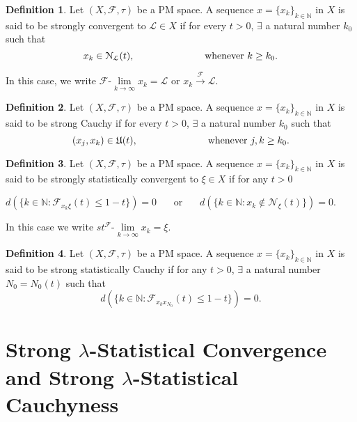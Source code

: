 \documentclass[reqno,b5paper]{amsart}
\theoremstyle{plain}
\theoremstyle{definition}
\newtheorem{defn}{Definition}[section]
\begin{document}
\begin{defn}\cite{Se}
Let $(X,\mathcal{F},\tau)$ be a PM space. A sequence
$x=\{x_k\}_{k\in \mathbb{N}}$ in $X$ is said to be strongly
convergent to $\mathcal{L}\in X$ if for every $t>0$, $\exists$ a
natural number $k_0$ such that
$$x_k\in\mathcal{N}_\mathcal{L}(t),\hspace{1 in} \text{whenever}~ k\geq k_0.$$
\end{defn}
In this case, we write
$\mathcal{F}$-$\lim\limits_{k\rightarrow\infty}x_k=\mathcal{L}$ or
$x_k\stackrel{\mathcal{F}}\longrightarrow \mathcal{L}$.
\begin{defn}\cite{Sh4}
Let $(X,\mathcal{F},\tau)$ be a PM space. A sequence
$x=\{x_k\}_{k\in \mathbb{N}}$ in $X$ is said to be strong Cauchy
if for every $t>0$, $\exists$ a natural number $k_0$ such that
$$(x_j,x_k)\in\mathfrak{U}(t), \hspace{1 in} \text{whenever}~ j,k\geq k_0 .$$
\end{defn}
\begin{defn}\cite{Se}
Let $(X,\mathcal{F},\tau)$ be a PM space. A sequence $x=\{x_k\}_{k
\in \mathbb{N}}$ in $X$ is said to be strongly statistically
convergent to $\xi\in X$ if for any $t>0$
\begin{center}
$d(\{ k\in\mathbb{N}: \mathcal{F}_{x_k\xi}(t)\leq1-t\})=0
~~~~~~~~\text{or}~~~~~~~~ d(\{ k\in\mathbb{N}:
x_k\notin\mathcal{N}_\xi(t)\})=0.$
\end{center}
In this case we write
$st^{\mathcal{F}}$-$\lim\limits_{k\rightarrow \infty}x_k =\xi$.
\end{defn}
\begin{defn}
Let $(X,\mathcal{F},\tau)$ be a PM space. A sequence $x=\{x_k\}_{k
\in \mathbb{N}}$ in $X$ is said to be strong statistically Cauchy
if for any $t>0$, $\exists$ a natural number $N_0=N_0(t)$ such
that
$$d(\{k\in\mathbb{N}:\mathcal{F}_{x_kx_{N_0}}(t)\leq 1-t\})=0.$$
\end{defn}

\section{\textbf{Strong $\lambda$-Statistical Convergence and Strong $\lambda$-Statistical Cauchyness}}
\end{document}
